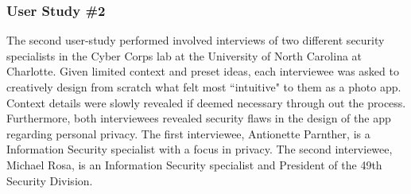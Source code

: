 \documentclass{tei2013}
\begin{document}
\begin{itemize}
\end{itemize}


\subsubsection{User Study \#2}
The second user-study performed involved interviews of two different security specialists in the Cyber Corps lab at the University of North Carolina at Charlotte. Given limited context and preset ideas, each  interviewee was asked to creatively design from scratch what felt most ``intuitive" to them as a photo app. Context details were slowly revealed if deemed necessary through out the process. Furthermore, both interviewees revealed security flaws in the design of the app regarding personal privacy. The first interviewee, Antionette Parnther, is a Information Security specialist with a focus in privacy. The second interviewee, Michael Rosa, is an Information Security specialist and President of the 49th Security Division.
\end{document}
